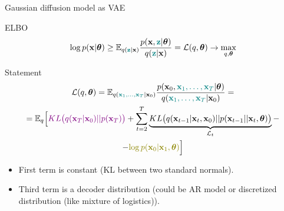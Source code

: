 \begin{frame}{Gaussian diffusion model as VAE}
	\begin{block}{ELBO}
		\vspace{-0.4cm}
		\[
			\log p(\mathbf{x} | \boldsymbol{\theta}) \geq \mathbb{E}_{q({\color{teal}\mathbf{z}} | \mathbf{x})} \frac{p(\mathbf{x}, {\color{teal}\mathbf{z}} | \boldsymbol{\theta})}{q({\color{teal}\mathbf{z}} | \mathbf{x})} = \mathcal{L}(q, \boldsymbol{\theta}) \rightarrow \max_{q, \boldsymbol{\theta}}
		\]
		\vspace{-0.5cm}
	\end{block}
	\begin{block}{Statement}
		\vspace{-0.8cm}
		\begin{multline*}
			\cL(q, \btheta) = \bbE_{q({\color{teal}\bx_1, \dots, \bx_T} | \bx_0)}\frac{p(\bx_0, {\color{teal}\bx_1, \dots, \bx_T} | \btheta)}{q({\color{teal}\bx_1, \dots, \bx_T} | \bx_0)} = \\ 
			= \bbE_{q} \Bigl[ {\color{violet}KL\bigl(q(\bx_T | \bx_0) || p(\bx_T)\bigr)}
			+ \sum_{t=2}^T \underbrace{KL \bigl(q(\bx_{t-1} | \bx_t, \bx_0) || p(\bx_{t - 1} || \bx_t, \btheta )\bigr)}_{\cL_t} - \\
			- {\color{olive}\log p(\bx_0 | \bx_1, \btheta)} \Bigr]
		\end{multline*}
		\vspace{-0.5cm}
	\end{block}
	\begin{itemize}
		\item {\color{violet}First term} is constant (KL between two standard normals).
		\item {\color{olive}Third term} is a decoder distribution (could be AR model or discretized distribution (like mixture of logistics)). 
	\end{itemize}
\end{frame}
